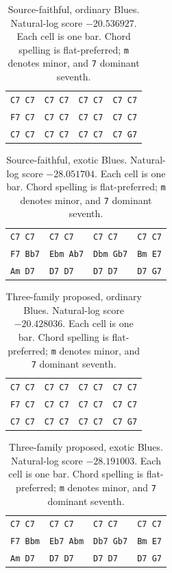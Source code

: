 \begin{table}[htbp]
\centering
\small
\begin{tabular}{llll}
\hline
\texttt{C7 C7} & \texttt{C7 C7} & \texttt{C7 C7} & \texttt{C7 C7} \\
\texttt{F7 C7} & \texttt{C7 C7} & \texttt{C7 C7} & \texttt{C7 C7} \\
\texttt{C7 C7} & \texttt{C7 C7} & \texttt{C7 C7} & \texttt{C7 G7} \\
\hline
\end{tabular}
\caption{Source-faithful, ordinary Blues. Natural-log score $-20.536927$. Each cell is one bar. Chord spelling is flat-preferred; \texttt{m} denotes minor, and \texttt{7} dominant seventh.}
\end{table}
\begin{table}[htbp]
\centering
\small
\begin{tabular}{llll}
\hline
\texttt{C7 C7} & \texttt{C7 C7} & \texttt{C7 C7} & \texttt{C7 C7} \\
\texttt{F7 Bb7} & \texttt{Ebm Ab7} & \texttt{Dbm Gb7} & \texttt{Bm E7} \\
\texttt{Am D7} & \texttt{D7 D7} & \texttt{D7 D7} & \texttt{D7 G7} \\
\hline
\end{tabular}
\caption{Source-faithful, exotic Blues. Natural-log score $-28.051704$. Each cell is one bar. Chord spelling is flat-preferred; \texttt{m} denotes minor, and \texttt{7} dominant seventh.}
\end{table}
\begin{table}[htbp]
\centering
\small
\begin{tabular}{llll}
\hline
\texttt{C7 C7} & \texttt{C7 C7} & \texttt{C7 C7} & \texttt{C7 C7} \\
\texttt{F7 C7} & \texttt{C7 C7} & \texttt{C7 C7} & \texttt{C7 C7} \\
\texttt{C7 C7} & \texttt{C7 C7} & \texttt{C7 C7} & \texttt{C7 G7} \\
\hline
\end{tabular}
\caption{Three-family proposed, ordinary Blues. Natural-log score $-20.428036$. Each cell is one bar. Chord spelling is flat-preferred; \texttt{m} denotes minor, and \texttt{7} dominant seventh.}
\end{table}
\begin{table}[htbp]
\centering
\small
\begin{tabular}{llll}
\hline
\texttt{C7 C7} & \texttt{C7 C7} & \texttt{C7 C7} & \texttt{C7 C7} \\
\texttt{F7 Bbm} & \texttt{Eb7 Abm} & \texttt{Db7 Gb7} & \texttt{Bm E7} \\
\texttt{Am D7} & \texttt{D7 D7} & \texttt{D7 D7} & \texttt{D7 G7} \\
\hline
\end{tabular}
\caption{Three-family proposed, exotic Blues. Natural-log score $-28.191003$. Each cell is one bar. Chord spelling is flat-preferred; \texttt{m} denotes minor, and \texttt{7} dominant seventh.}
\end{table}

